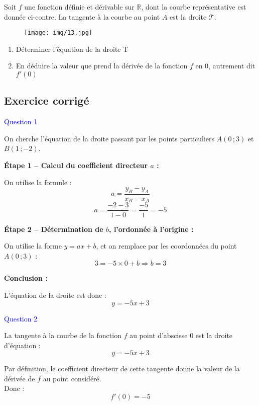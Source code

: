 \documentclass[a4paper,12pt]{article}
\begin{document}
Soit $f$ une fonction définie et dérivable sur $\mathbb{R}$, dont la courbe représentative est donnée ci-contre. La tangente à la courbe au point $A$ est la droite $\mathcal{T}$.

\begin{figure}[H]
  \centering
  \texttt{[image: img/13.jpg]}
\end{figure}

\begin{enumerate}[noitemsep]
  \item Déterminer l'équation de la droite T
  \item En déduire la valeur que prend la dérivée de la fonction $f$ en 0, autrement dit $f'(0)$
\end{enumerate}

\subsection*{Exercice corrigé}

\textcolor{blue}{Question 1}

\vspace{1em}

On cherche l'équation de la droite passant par les points particuliers $A(0\,; 3)$ et $B(1\,; -2)$.

\textbf{Étape 1 – Calcul du coefficient directeur $a$ :}

On utilise la formule :
\[
a = \frac{y_B - y_A}{x_B - x_A}
\]
\[
a = \frac{-2 - 3}{1 - 0} = \frac{-5}{1} = -5
\]

\textbf{Étape 2 – Détermination de $b$, l'ordonnée à l'origine :}

On utilise la forme $y = ax + b$, et on remplace par les coordonnées du point $A(0\,; 3)$ :
\[
3 = -5 \times 0 + b \Rightarrow b = 3
\]

\textbf{Conclusion :}

L'équation de la droite est donc :
\[
y = -5x + 3
\]

\textcolor{blue}{Question 2}

\vspace{1em}

La tangente à la courbe de la fonction \( f \) au point d’abscisse \( 0 \) est la droite d’équation :
\[
y = -5x + 3
\]

Par définition, le coefficient directeur de cette tangente donne la valeur de la dérivée de \( f \) au point considéré.\\

Donc :
\[
f'(0) = -5
\]
\end{document}
